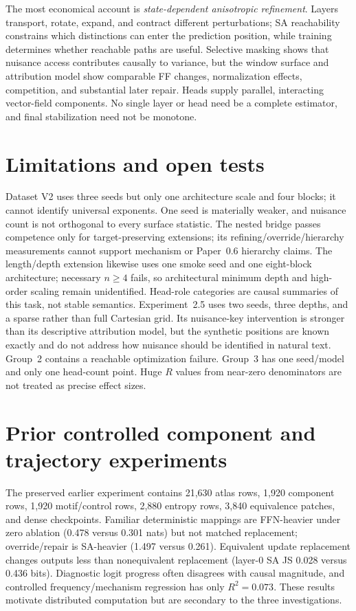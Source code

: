 \documentclass[10pt]{article}
\begin{document}
The most economical account is \emph{state-dependent anisotropic refinement}. Layers transport, rotate, expand, and contract different perturbations; SA reachability constrains which distinctions can enter the prediction position, while training determines whether reachable paths are useful. Selective masking shows that nuisance access contributes causally to variance, but the window surface and attribution model show comparable FF changes, normalization effects, competition, and substantial later repair. Heads supply parallel, interacting vector-field components. No single layer or head need be a complete estimator, and final stabilization need not be monotone.

\section{Limitations and open tests}
Dataset V2 uses three seeds but only one architecture scale and four blocks; it cannot identify universal exponents. One seed is materially weaker, and nuisance count is not orthogonal to every surface statistic. The nested bridge passes competence only for target-preserving extensions; its refining/override/hierarchy measurements cannot support mechanism or Paper~0.6 hierarchy claims. The length/depth extension likewise uses one smoke seed and one eight-block architecture; necessary $n\geq4$ fails, so architectural minimum depth and high-order scaling remain unidentified. Head-role categories are causal summaries of this task, not stable semantics. Experiment~2.5 uses two seeds, three depths, and a sparse rather than full Cartesian grid. Its nuisance-key intervention is stronger than its descriptive attribution model, but the synthetic positions are known exactly and do not address how nuisance should be identified in natural text. Group~2 contains a reachable optimization failure. Group~3 has one seed/model and only one head-count point. Huge $R$ values from near-zero denominators are not treated as precise effect sizes.

\appendix
\section{Prior controlled component and trajectory experiments}
The preserved earlier experiment contains 21,630 atlas rows, 1,920 component rows, 1,920 motif/control rows, 2,880 entropy rows, 3,840 equivalence patches, and dense checkpoints. Familiar deterministic mappings are FFN-heavier under zero ablation (0.478 versus 0.301 nats) but not matched replacement; override/repair is SA-heavier (1.497 versus 0.261). Equivalent update replacement changes outputs less than nonequivalent replacement (layer-0 SA JS 0.028 versus 0.436 bits). Diagnostic logit progress often disagrees with causal magnitude, and controlled frequency/mechanism regression has only $R^2=0.073$. These results motivate distributed computation but are secondary to the three investigations.
\end{document}
